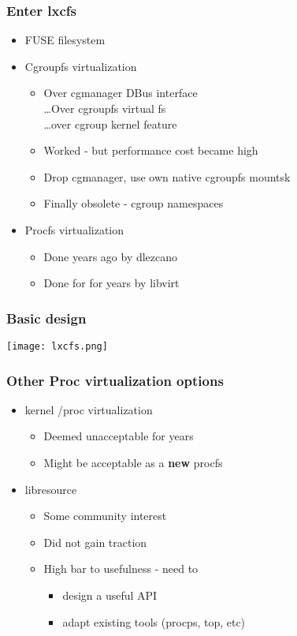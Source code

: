 \documentclass{beamer}
\begin{document}
\begin{frame}[fragile]
\frametitle{Enter lxcfs}
	\begin{itemize}
	\item FUSE filesystem
	\item Cgroupfs virtualization
		\begin{itemize}
		\item Over cgmanager DBus interface \\
			\ldots Over cgroupfs virtual fs \\
			\ldots over cgroup kernel feature
		\item Worked - but performance cost became high
		\pause
		\item Drop cgmanager, use own native cgroupfs mountsk
		\pause
		\item Finally obsolete - cgroup namespaces
		\end{itemize}
	\pause
	\item Procfs virtualization
		\begin{itemize}
		\item Done years ago by dlezcano
		\item Done for for years by libvirt
		\end{itemize}
	\end{itemize}
\end{frame}

\begin{frame}
\frametitle{Basic design}
\texttt{[image: lxcfs.png]}
\end{frame}

\begin{frame}
\frametitle{Other Proc virtualization options}
\begin{itemize}
\item kernel /proc virtualization
	\begin{itemize}
	\item Deemed unacceptable for years
	\item Might be acceptable as a {\bf new} procfs
	\end{itemize}
\item libresource
	\begin{itemize}
	\item Some community interest
	\item Did not gain traction
	\item High bar to usefulness - need to
		\begin{itemize}
		\item design a useful API
		\item adapt existing tools (procps, top, etc)
		\end{itemize}
	\end{itemize}
\end{itemize}
\end{frame}
\end{document}

